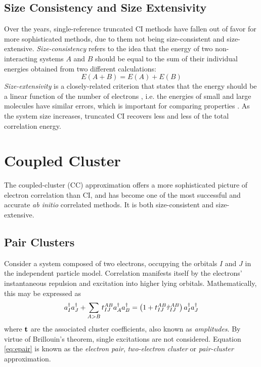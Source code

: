 \subsection{Size Consistency and Size Extensivity}

Over the years, single-reference truncated CI methods have fallen out of favor for more sophisticated methods, due to them not being size-consistent and size-extensive. \emph{Size-consistency} refers to the idea that the energy of two non-interacting systems $A$ and $B$ should be equal to the sum of their individual energies obtained from two different calculations:
\begin{equation}
E(A+B) = E(A) + E(B)
\end{equation}
\noindent \emph{Size-extensivity} is a closely-related criterion that states that the energy should be a linear function of the number of electrons , i.e. the energies of small and large molecules have similar errors, which is important for comparing properties \cite{You2004}. As the system size increases, truncated CI recovers less and less of the total correlation energy.

\section{Coupled Cluster}

The coupled-cluster (CC) approximation offers a more sophisticated picture of electron correlation than CI, and has become one of the most successful and accurate \emph{ab initio} correlated methods. It is both size-consistent and size-extensive.

\subsection{Pair Clusters}

Consider a system composed of two electrons, occupying the orbitals $I$ and $J$ in the independent particle model. Correlation manifests itself by the electrons' instantaneous repulsion and excitation into higher lying orbitals. Mathematically, this may be expressed as \cite{Hel2000}
\begin{equation}
a^{\dagger}_I a^{\dagger}_J + \sum_{A > B} t_{IJ}^{AB} a^{\dagger}_A a^{\dagger}_B = \left( 1 + t_{IJ}^{AB} \hat{\tau}_{IJ}^{AB} \right) a^{\dagger}_I  a^{\dagger}_J 
\label{eq:epair}
\end{equation}
\noindent where $\mathbf{t}$ are the associated cluster coefficients, also known as \emph{amplitudes}. By virtue of Brillouin's theorem, single excitations are not considered. Equation \ref{eq:epair} is known as the \emph{electron pair}, \emph{two-electron cluster} or \emph{pair-cluster} approximation. 

